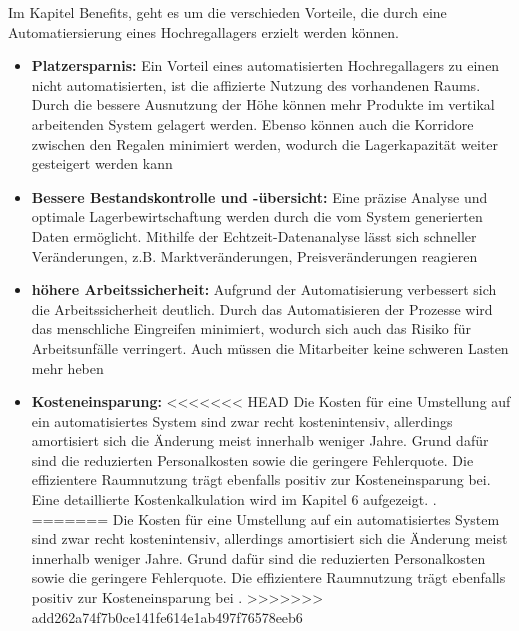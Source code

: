 Im Kapitel Benefits, geht es um die verschieden Vorteile, die durch eine Automatiersierung eines Hochregallagers erzielt werden können.
\begin{itemize}
	\item \textbf{Platzersparnis:}
	Ein Vorteil eines automatisierten Hochregallagers zu einen nicht automatisierten, ist die affizierte Nutzung des vorhandenen Raums. Durch die bessere Ausnutzung der Höhe können mehr Produkte im vertikal arbeitenden System gelagert werden. Ebenso können auch die Korridore zwischen den Regalen minimiert werden, wodurch die Lagerkapazität weiter gesteigert werden kann
	\item \textbf{Bessere Bestandskontrolle und -übersicht:}
	Eine präzise Analyse und optimale Lagerbewirtschaftung werden durch die vom System generierten Daten ermöglicht. Mithilfe der Echtzeit-Datenanalyse lässt sich schneller Veränderungen, z.B. Marktveränderungen, Preisveränderungen reagieren %
	\item \textbf{höhere Arbeitssicherheit:}
	Aufgrund der Automatisierung verbessert sich die Arbeitssicherheit deutlich. Durch das Automatisieren der Prozesse wird das menschliche Eingreifen minimiert, wodurch sich auch das Risiko für Arbeitsunfälle verringert. Auch müssen die Mitarbeiter keine schweren Lasten mehr heben %
	\item \textbf{Kosteneinsparung:}
<<<<<<< HEAD
	Die Kosten für eine Umstellung auf ein automatisiertes System sind zwar recht kostenintensiv, allerdings amortisiert sich die Änderung meist innerhalb weniger Jahre. Grund dafür sind die reduzierten Personalkosten sowie die geringere Fehlerquote. Die effizientere Raumnutzung trägt ebenfalls positiv zur Kosteneinsparung bei. Eine detaillierte Kostenkalkulation wird im Kapitel 6 aufgezeigt. \autocite{mueller2023}.
=======
	Die Kosten für eine Umstellung auf ein automatisiertes System sind zwar recht kostenintensiv, allerdings amortisiert sich die Änderung meist innerhalb weniger Jahre. Grund dafür sind die reduzierten Personalkosten sowie die geringere Fehlerquote. Die effizientere Raumnutzung trägt ebenfalls positiv zur Kosteneinsparung bei %
	\autocite{mueller2023}.
>>>>>>> add262a74f7b0ce141fe614e1ab497f76578eeb6
	
\end{itemize}